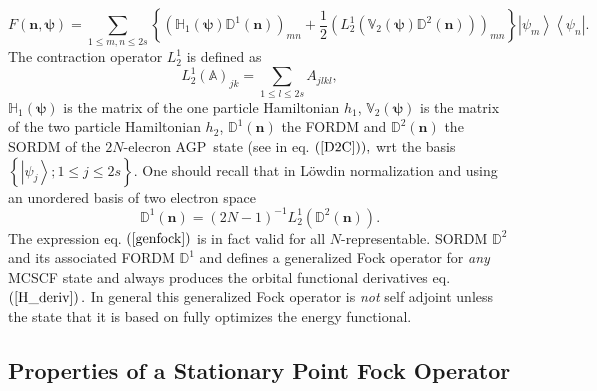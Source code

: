 \documentclass[aps,preprint]{revtex4}%
\begin{document}
\begin{equation}
F\left(  \mathbf{n,\psi}\right)  =\sum_{1\leq m,n\leq2s}\left\{  \left(
\mathbb{H}_{1}\left(  \mathbf{\psi}\right)  \mathbb{D}^{1}\left(
\mathbf{n}\right)  \right)  _{mn}+\frac{1}{2}\left(  L_{2}^{1}\left(
\mathbb{V}_{2}\left(  \mathbf{\psi}\right)  \mathbb{D}^{2}\left(
\mathbf{n}\right)  \right)  \right)  _{mn}\right\}  \left\vert \psi
_{m}\right\rangle \left\langle \psi_{n}\right\vert . \label{genfock}%
\end{equation}
The contraction operator $L_{2}^{1}$ is defined as
\begin{equation}
L_{2}^{1}\left(  \mathbb{A}\right)  _{jk}=\sum_{1\leq l\leq2s}A_{jlkl},
\end{equation}
$\mathbb{H}_{1}\left(  \mathbf{\psi}\right)  $ is the matrix of the one
particle Hamiltonian $h_{1}$, $\mathbb{V}_{2}\left(  \mathbf{\psi}\right)  $
is the matrix of the two particle Hamiltonian $h_{2}$, $\mathbb{D}^{1}\left(
\mathbf{n}\right)  $ the FORDM and $\mathbb{D}^{2}\left(  \mathbf{n}\right)  $
the SORDM of the $2N$-elecron AGP\ state (see in eq. $\left(  \ref{D2C}%
\right)  ),$ wrt the basis $\left\{  \left\vert \psi_{j}\right\rangle ;1\leq
j\leq2s\right\}  .$ One should recall that in L\"{o}wdin normalization and
using an unordered basis of two electron space
\begin{equation}
\mathbb{D}^{1}\left(  \mathbf{n}\right)  =\left(  2N-1\right)  ^{-1}L_{2}%
^{1}\left(  \mathbb{D}^{2}\left(  \mathbf{n}\right)  \right)  .
\end{equation}
The expression eq. $\left(  \ref{genfock}\right)  $ is in fact valid for all
$N$-representable. SORDM $\mathbb{D}^{2}$ and its associated FORDM
$\mathbb{D}^{1}$ and defines a generalized Fock operator for \emph{any }MCSCF
state and always produces the orbital functional derivatives eq. $\left(
\ref{H_deriv}\right)  .$ In general this generalized Fock operator is
\emph{not }self adjoint\emph{ }unless the state that it is based on fully
optimizes the energy functional.

\subsection{Properties of a Stationary Point Fock Operator\label{Stat_Fock}}
\end{document}
